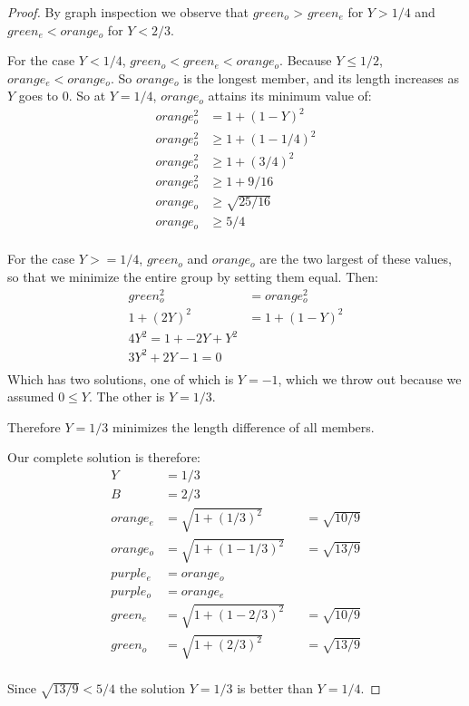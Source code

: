 \documentclass[11pt]{article}
\begin{document}
\begin{proof}
 By graph inspection we observe that $green_o$ > $green_e$ for $Y > 1/4$ and $green_e < orange_o$ for $Y < 2/3$.

 For the case $Y < 1/4$, $green_o < green_e < orange_o$. Because $Y \leq 1/2$, $orange_e < orange_o$. So $orange_o$
 is the longest member, and its length increases as $Y$ goes to $0$. So at $Y = 1/4$, $orange_o$ attains its
 minimum value of:
\begin{align*}
 orange_o^2 &= 1 + (1-Y)^2 \\
 orange_o^2 &\geq 1 + (1-1/4)^2 \\
 orange_o^2 &\geq 1 + (3/4)^2 \\
 orange_o^2 &\geq 1 + 9/16 \\
 orange_o &\geq \sqrt{25/16} \\
    orange_o &\geq 5/4 \\ 
 \end{align*}
  
For the case $Y >= 1/4$, $green_o$ and $orange_o$ are the two largest of these values, so that
we minimize the entire group by setting them equal.
 Then:
\begin{align*}
  green_o^2 &= orange_o^2 \\
  1 + (2Y)^2 &= 1 + (1-Y)^2 \\
  4Y^2 = 1 + -2Y + Y^2 \\
  3Y^2 + 2Y - 1 = 0 \\
\end{align*}
Which has two solutions, one of which is $Y = -1$, which we throw out because we assumed $0 \leq Y$. The other is $Y = 1/3$.

Therefore $Y = 1/3$ minimizes the length difference of all members.


Our complete solution is therefore:
\begin{align*}
  Y &= 1/3 \\
  B &= 2/3 \\  
   orange_e &= \sqrt{1 + (1/3)^2} & &= \sqrt{10/9} \\
 orange_o &= \sqrt{1 + (1-1/3)^2} & &= \sqrt{13/9} \\
 purple_e &=  orange_o  \\
 purple_o &=  orange_e \\
 green_e &=  \sqrt{ 1 + (1 - 2/3)^2} & &= \sqrt{10/9} \\ 
 green_o &=  \sqrt{1 + (2/3)^2} & &= \sqrt{13/9} \\
\end{align*}

Since $\sqrt{13/9} < 5/4$ the solution $Y = 1/3$ is better than $Y = 1/4$.

 \end{proof}
\end{document}
